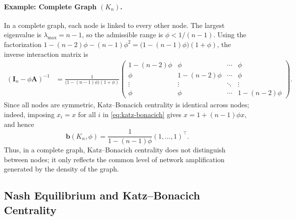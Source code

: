 \paragraph{Example: Complete Graph $(K_n)$.}
In a complete graph, each node is linked to every other node. The largest
eigenvalue is $\lambda_{\max}=n-1$, so the admissible range is
$\phi<1/(n-1)$. Using the factorization
$1-(n-2)\phi-(n-1)\phi^2=\bigl(1-(n-1)\phi\bigr)(1+\phi)$, the inverse
interaction matrix is
\begin{align*}
(\mathbf I_n-\phi \mathbf A)^{-1}
&=
\frac{1}{\bigl(1-(n-1)\phi\bigr)(1+\phi)}
\begin{pmatrix}
1-(n-2)\phi & \phi & \cdots & \phi \\
\phi & 1-(n-2)\phi & \cdots & \phi \\
\vdots & \vdots & \ddots & \vdots \\
\phi & \phi & \cdots & 1-(n-2)\phi
\end{pmatrix}.
\end{align*}
Since all nodes are symmetric, Katz--Bonacich centrality is identical across
nodes; indeed, imposing $x_i=x$ for all $i$ in \eqref{eq:katz-bonacich} gives
$x=1+(n-1)\phi x$, and hence
\begin{equation}
\mathbf b(K_n,\phi)
=
\frac{1}{1-(n-1)\phi}
(1,\dots,1)^\top .
\label{eq:bonacich-complete-graph}
\end{equation}
Thus, in a complete graph, Katz--Bonacich centrality does not distinguish
between nodes; it only reflects the common level of network amplification
generated by the density of the graph.

\subsection{Nash Equilibrium and Katz--Bonacich Centrality}
\label{sec:nash-katz}

